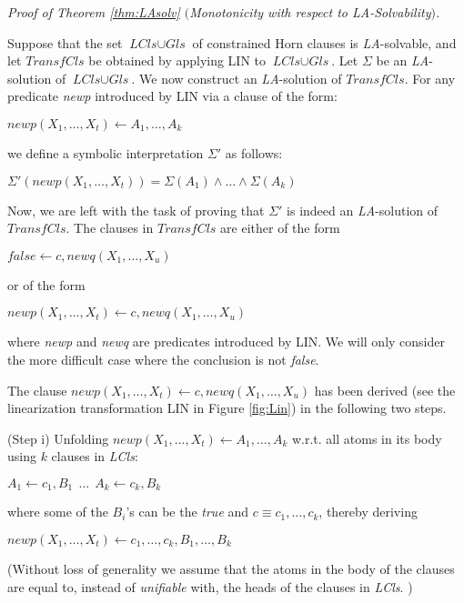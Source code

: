 \documentclass[english]{tlp}
\begin{document}
\medskip

\noindent
{\it Proof of Theorem \ref{thm:LAsolv} $($Monotonicity with respect to {\it LA}-Solvability$)$.}

\noindent
Suppose that the set $\textit{LCls}\cup \textit{Gls}$ of constrained Horn clauses
is {\it LA}-solvable, and let $\textit{TransfCls}$ be obtained by applying
LIN to $\textit{LCls}\cup \textit{Gls}$. 
Let $\Sigma$ be an {\it LA}-solution of $\textit{LCls}\cup \textit{Gls}$. We now construct an {\it LA}-solution of $\textit{TransfCls}$.
For any predicate {\it newp} introduced by LIN via a clause of the form:

$\textit{newp}(X_1,\ldots,X_t) \leftarrow A_1, \ldots, A_k$

\noindent
we define a symbolic interpretation $\Sigma'$ as follows:

$\Sigma'(\textit{newp}(X_1,\ldots,X_t)) = \Sigma(A_1) \wedge \ldots \wedge \Sigma(A_k)$

\noindent
Now, we are left with the task of proving that $\Sigma'$ is indeed an
{\it LA}-solution of $\textit{TransfCls}$.
The clauses in $\textit{TransfCls}$ are either of the form

$\textit{false} \leftarrow c, \textit{newq}(X_1,\ldots,X_u)$

\noindent
or of the form

$\textit{newp}(X_1,\ldots,X_t) \leftarrow c, \textit{newq}(X_1,\ldots,X_u)$

\noindent
where \textit{newp} and \textit{newq} are
 predicates  introduced by LIN. We will only consider the more difficult case where
the conclusion is not \textit{false}.

The clause $\textit{newp}(X_1,\ldots,X_t) \leftarrow c, \textit{newq}(X_1,\ldots,X_u)$
has been derived (see the {\rm linearization} transformation LIN in Figure \ref{fig:Lin})
in the following two steps.

\noindent
(Step i) Unfolding  $\textit{newp}(X_1,\ldots,X_t) \leftarrow A_1, \ldots, A_k$
w.r.t. all atoms in its body using $k$ clauses in \textit{LCls}:

$A_1 \leftarrow c_1, B_1 \ \ \ldots \ \  A_k\leftarrow c_k, B_k$

\noindent
where some of the $B_i$'s can be the \textit{true} and $c \equiv c_1,\ldots,c_k$, thereby deriving

$\textit{newp}(X_1,\ldots,X_t) \leftarrow c_1, \ldots, c_k, B_1, \ldots, B_k$

\noindent
(Without loss of generality we assume that the atoms in the body
of the clauses are equal to, instead of {\it unifiable} with,
the heads of the clauses in \textit{LCls}. )
\end{document}
